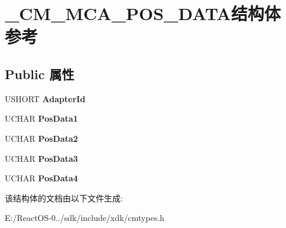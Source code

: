 \hypertarget{struct___c_m___m_c_a___p_o_s___d_a_t_a}{}\section{\+\_\+\+C\+M\+\_\+\+M\+C\+A\+\_\+\+P\+O\+S\+\_\+\+D\+A\+T\+A结构体 参考}
\label{struct___c_m___m_c_a___p_o_s___d_a_t_a}
\subsection*{Public 属性}
\begin{DoxyCompactItemize}
\item 
\mbox{\label{struct___c_m___m_c_a___p_o_s___d_a_t_a_a892cdacf7dbed907299e392d3d450030}} 
U\+S\+H\+O\+RT {\bfseries Adapter\+Id}
\item 
\mbox{\label{struct___c_m___m_c_a___p_o_s___d_a_t_a_af9fdb790550d7b92ba121ecd5e293858}} 
U\+C\+H\+AR {\bfseries Pos\+Data1}
\item 
\mbox{\label{struct___c_m___m_c_a___p_o_s___d_a_t_a_a5438a183e2b3b27d9e8c303d0505c997}} 
U\+C\+H\+AR {\bfseries Pos\+Data2}
\item 
\mbox{\label{struct___c_m___m_c_a___p_o_s___d_a_t_a_a59616bda33f40f0b00d17026c9eaf1f8}} 
U\+C\+H\+AR {\bfseries Pos\+Data3}
\item 
\mbox{\label{struct___c_m___m_c_a___p_o_s___d_a_t_a_a1f2ecb8ba00f75051f6a7bc1e77a01cc}} 
U\+C\+H\+AR {\bfseries Pos\+Data4}
\end{DoxyCompactItemize}


该结构体的文档由以下文件生成\+:\begin{DoxyCompactItemize}
\item 
E\+:/\+React\+O\+S-\/0../sdk/include/xdk/cmtypes.\+h\end{DoxyCompactItemize}
